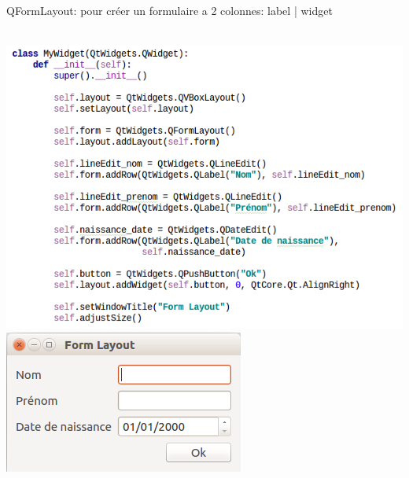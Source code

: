 \documentclass[9pt, french, brown]{beamer}
\newcommand{\mytitle}[1]{{\color{brown}#1 \\~\\}}
\begin{document}
\begin{frame}{\secname}{\subsecname}
\mytitle{QFormLayout: pour créer un formulaire a 2 colonnes: label | widget}
\begin{center}\includegraphics[scale=0.3]{img/widget5_1}\includegraphics[scale=0.3]{img/widget5_1_fig}\end{center}
\end{frame}
\end{document}
